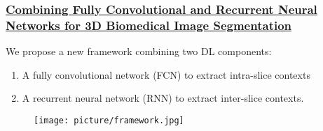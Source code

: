 \documentclass{beamer}
\begin{document}
\begin{frame}
  \frametitle{\href{https://arxiv.org/pdf/1609.01006v2.pdf}
    {Combining Fully Convolutional and Recurrent Neural Networks for 3D Biomedical Image Segmentation}}
  We propose a new framework combining two DL components:
  \begin{enumerate}
  \item A fully convolutional network (FCN) to extract intra-slice contexts
  \item A recurrent neural network (RNN) to extract inter-slice contexts.
  \end{enumerate}

  \begin{figure}[!htb]
    \centering
    \texttt{[image: picture/framework.jpg]}
  \end{figure}

  
\end{frame}

\end{document}
